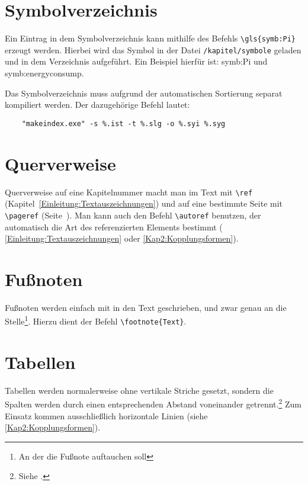 \section{Symbolverzeichnis}
Ein Eintrag in dem Symbolverzeichnis kann mithilfe des Befehls \verb*|\gls{symb:Pi}| erzeugt werden. Hierbei wird das Symbol in der Datei \texttt{/kapitel/symbole} geladen und in dem Verzeichnis aufgeführt. Ein Beispiel hierfür ist: \gls{symb:Pi} und \gls{symb:energyconsump}.

Das Symbolverzeichnis muss aufgrund der automatischen Sortierung separat kompiliert werden. Der dazugehörige Befehl lautet:

\begin{verbatim}
	"makeindex.exe" -s %.ist -t %.slg -o %.syi %.syg
\end{verbatim}


\section{Querverweise}

Querverweise auf eine Kapitelnummer macht man im Text mit \verb+\ref+ (Kapitel~\ref{Einleitung:Textauszeichnungen}) und auf eine bestimmte Seite mit \verb+\pageref+ (Seite~\pageref{Einleitung:Textauszeichnungen}). Man kann auch den Befehl \verb+\autoref+ benutzen, der automatisch die Art des referenzierten Elements bestimmt (\zb{} \autoref{Einleitung:Textauszeichnungen} oder \autoref{Kap2:Kopplungsformen}).


\section{Fußnoten}

Fußnoten werden einfach mit in den Text geschrieben, und zwar genau an die Stelle\footnote{An der die Fußnote auftauchen soll}. Hierzu dient der Befehl \verb+\footnote{Text}+.


\section{Tabellen}

Tabellen werden normalerweise ohne vertikale Striche gesetzt, sondern die Spalten werden durch einen entsprechenden Abstand voneinander getrennt.\footnote{Siehe \cite[S. 89]{Willberg2021}.} Zum Einsatz kommen ausschließlich horizontale Linien (siehe \autoref{Kap2:Kopplungsformen}).

